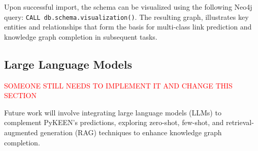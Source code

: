Upon successful import, the schema can be visualized using the following Neo4j query: \texttt{CALL db.schema.visualization()}. The resulting graph, illustrates key entities and relationships that form the basis for multi-class link prediction and knowledge graph completion in subsequent tasks.

\subsection*{Large Language Models}

\textcolor{red}{SOMEONE STILL NEEDS TO IMPLEMENT IT AND CHANGE THIS SECTION}

Future work will involve integrating large language models (LLMs) to complement PyKEEN's predictions, exploring zero-shot, few-shot, and retrieval-augmented generation (RAG) techniques to enhance knowledge graph completion.

